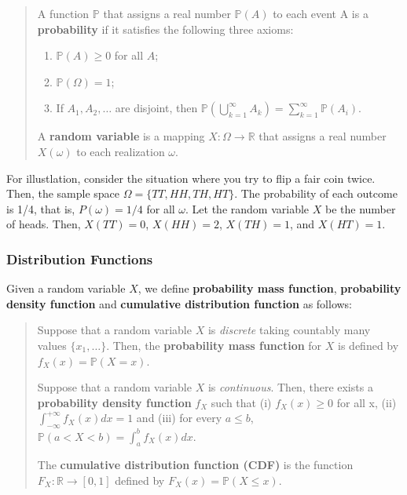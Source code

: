 \documentclass[
  12pt,
]{article}
\providecommand{\tightlist}{%
  \setlength{\itemsep}{0pt}\setlength{\parskip}{0pt}}
\begin{document}
\begin{quote}
A function \(\mathbb{P}\) that assigns a real number \(\mathbb{P}(A)\) to each event A is a \textbf{probability} if it satisfies the following three axioms:

\begin{enumerate}
\def\labelenumi{\arabic{enumi}.}
\tightlist
\item
  \(\mathbb{P}(A) \ge 0\) for all \(A\);
\item
  \(\mathbb{P}(\Omega) = 1\);
\item
  If \(A_1, A_2, \ldots\) are disjoint, then \(\mathbb{P}(\bigcup_{k=1}^{\infty}{A_k}) = \sum_{k=1}^{\infty} \mathbb{P}(A_i)\).
\end{enumerate}

A \textbf{random variable} is a mapping \(X: \Omega \to \mathbb{R}\) that assigns a real number \(X(\omega)\) to each realization \(\omega\).
\end{quote}

For illustlation, consider the situation where you try to flip a fair coin twice.
Then, the sample space \(\Omega = \{ TT, HH, TH, HT \}\).
The probability of each outcome is 1/4, that is, \(P(\omega) = 1/4\) for all \(\omega\).
Let the random variable \(X\) be the number of heads.
Then, \(X(TT) = 0\), \(X(HH) = 2\), \(X(TH) = 1\), and \(X(HT) = 1\).

\hypertarget{distribution-functions}{%
\subsubsection{Distribution Functions}\label{distribution-functions}}

Given a random variable \(X\), we define \textbf{probability mass function}, \textbf{probability density function} and \textbf{cumulative distribution function} as follows:

\begin{quote}
Suppose that a random variable \(X\) is \emph{discrete} taking countably many values \(\{x_1, \ldots\}\). Then, the \textbf{probability mass function} for \(X\) is defined by \(f_X(x) = \mathbb{P}(X = x)\).

Suppose that a random variable \(X\) is \emph{continuous}. Then, there exists a \textbf{probability density function} \(f_X\) such that (i) \(f_X(x) \ge 0\) for all x, (ii) \(\int_{-\infty}^{+\infty} f_X(x) dx = 1\) and (iii) for every \(a \le b\), \(\mathbb{P}(a < X < b) = \int_a^b f_X(x)dx\).

The \textbf{cumulative distribution function (CDF)} is the function \(F_X: \mathbb{R} \to [0, 1]\) defined by \(F_X(x) = \mathbb{P}(X \le x)\).
\end{quote}
\end{document}
